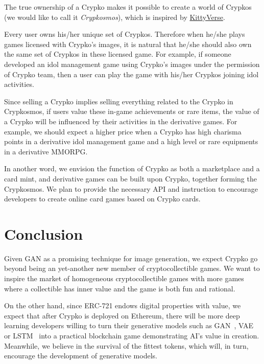 \documentclass[b5paper]{article}
\begin{document}
The true ownership of a Crypko makes it possible to create a world of Crypkos (we would like to call it \emph{Crypkosmos}), which is inspired by \href{https://www.cryptokitties.co/kittyverse}{KittyVerse}. 

Every user owns his/her unique set of Crypkos. 
Therefore when he/she plays games licensed with Crypko's images, it is natural that he/she should also own the same set of Crypkos in these licensed game. 
For example, if someone developed an idol management game using Crypko's images under the permission of Crypko team, then a user can play the game with his/her Crypkos joining idol activities.

Since selling a Crypko implies selling everything related to the Crypko in Crypkosmos, 
if users value these in-game achievements or rare items, 
the value of a Crypko will be influenced by their activities in the derivative games. 
For example, we should expect a higher price when a Crypko has high charisma points in a derivative idol management game and a high level or rare equipments in a derivative MMORPG.

In another word, we envision the function of Crypko as both a marketplace and a card mint, 
and derivative games can be built upon Crypko, together forming the Crypkosmos. 
We plan to provide the necessary API and instruction to encourage developers to create online card games based on Crypko cards.

\section{Conclusion}

Given GAN as a promising technique for image generation, we expect Crypko go beyond being an yet-another new member of cryptocollectible games. 
We want to inspire the market of homogeneous cryptocollectible games with more games where a collectible has inner value and the game is both fun and rational.

On the other hand, since ERC-721 endows digital properties with value, 
we expect that after Crypko is deployed on Ethereum, 
there will be more deep learning developers willing to turn their generative models such as GAN~\cite{goodfellow2014generative}, VAE~\cite{kingma2013auto} or LSTM~\cite{hochreiter1997long} 
into a practical blockchain game demonstrating AI's value in creation. 
Meanwhile, we believe in the survival of the fittest tokens, which will, in turn, encourage the development of generative models.
\end{document}

